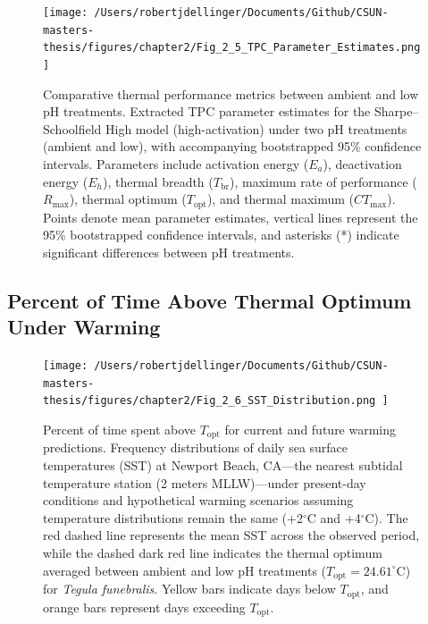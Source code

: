 \documentclass{CSUNthesis}
\begin{document}
\begin{figure}[H]
  \centering
  \texttt{[image:  /Users/robertjdellinger/Documents/Github/CSUN-masters-thesis/figures/chapter2/Fig\_2\_5\_TPC\_Parameter\_Estimates.png ]}
  \caption[Comparative thermal performance metrics between ambient and low pH treatments.]{Comparative thermal performance metrics between ambient and low pH treatments. Extracted TPC parameter estimates for the Sharpe--Schoolfield High model (high-activation) under two pH treatments (ambient and low), with accompanying bootstrapped 95\% confidence intervals. Parameters include activation energy ($E_a$), deactivation energy ($E_h$), thermal breadth ($T_{\text{br}}$), maximum rate of performance ($R_{\text{max}}$), thermal optimum ($T_{\text{opt}}$), and thermal maximum ($CT_{\text{max}}$). Points denote mean parameter estimates, vertical lines represent the 95\% bootstrapped confidence intervals, and asterisks (*) indicate significant differences between pH treatments.}
  \label{fig:tpc_metrics}
\end{figure}

\subsection*{Percent of Time Above Thermal Optimum Under Warming}\label{percent-of-time-above-thermal-optimum-under-warming}

\begin{figure}[H]
  \centering
  \texttt{[image:  /Users/robertjdellinger/Documents/Github/CSUN-masters-thesis/figures/chapter2/Fig\_2\_6\_SST\_Distribution.png ]}
  \caption[Percent of time spent above thermal optimum under current and future warming.]{Percent of time spent above $T_{\text{opt}}$ for current and future warming predictions. Frequency distributions of daily sea surface temperatures (SST) at Newport Beach, CA—the nearest subtidal temperature station (2 meters MLLW)—under present-day conditions and hypothetical warming scenarios assuming temperature distributions remain the same (+2$^\circ$C and +4$^\circ$C). The red dashed line represents the mean SST across the observed period, while the dashed dark red line indicates the thermal optimum averaged between ambient and low pH treatments ($T_{\text{opt}} = 24.61^\circ$C) for \textit{Tegula funebralis}. Yellow bars indicate days below $T_{\text{opt}}$, and orange bars represent days exceeding $T_{\text{opt}}$.}
  \label{fig:sst_distribution}
\end{figure}
\end{document}
